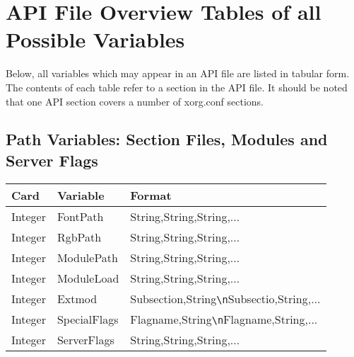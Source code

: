 \section{API File Overview Tables of all Possible Variables}
Below, all variables which may appear in an API file are listed in tabular
form. The contents of each table refer to a section in the API file. It should
be noted that one API section covers a number of xorg.conf sections.

\subsection{Path Variables: Section Files, Modules and Server Flags}
\begin{tabular}[h]{|p{2cm}|p{4cm}|p{7cm}|}
 \hline
 \textbf{Card} & \textbf{Variable}     & \textbf{Format}                \\
 \hline
 Integer & FontPath     & String,String,String,...                       \\
 Integer & RgbPath      & String,String,String,...                       \\ 
 Integer & ModulePath   & String,String,String,...                       \\
 Integer & ModuleLoad   & String,String,String,...                       \\
 Integer & Extmod       & Subsection,String\verb+\n+Subsectio,String,... \\ 
 Integer & SpecialFlags & Flagname,String\verb+\n+Flagname,String,...    \\
 Integer & ServerFlags  & String,String,String,...                       \\
 \hline
\end{tabular}

